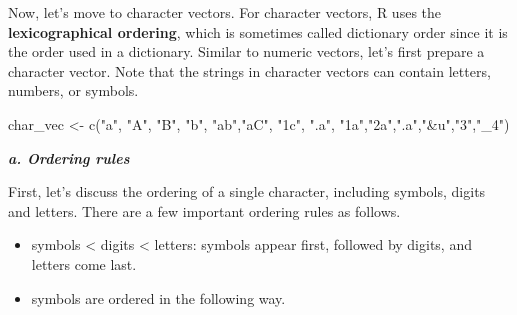 \documentclass[
]{book}
\newenvironment{Shaded}{\begin{snugshade}}{\end{snugshade}}
\newcommand{\FunctionTok}[1]{\textcolor[rgb]{0.00,0.00,0.00}{#1}}
\newcommand{\NormalTok}[1]{#1}
\newcommand{\OtherTok}[1]{\textcolor[rgb]{0.56,0.35,0.01}{#1}}
\newcommand{\StringTok}[1]{\textcolor[rgb]{0.31,0.60,0.02}{#1}}
\providecommand{\tightlist}{%
  \setlength{\itemsep}{0pt}\setlength{\parskip}{0pt}}
\begin{document}
Now, let's move to character vectors. For character vectors, R uses the \textbf{lexicographical ordering}, which is sometimes called dictionary order since it is the order used in a dictionary. Similar to numeric vectors, let's first prepare a character vector. Note that the strings in character vectors can contain letters, numbers, or symbols.

\begin{Shaded}
\begin{Highlighting}[]
\NormalTok{char\_vec }\OtherTok{\textless{}{-}} \FunctionTok{c}\NormalTok{(}\StringTok{"a"}\NormalTok{, }\StringTok{"A"}\NormalTok{, }\StringTok{"B"}\NormalTok{, }\StringTok{"b"}\NormalTok{, }\StringTok{"ab"}\NormalTok{,}\StringTok{"aC"}\NormalTok{, }\StringTok{"1c"}\NormalTok{, }\StringTok{".a"}\NormalTok{, }\StringTok{"1a"}\NormalTok{,}\StringTok{"2a"}\NormalTok{,}\StringTok{".a"}\NormalTok{,}\StringTok{"\&u"}\NormalTok{,}\StringTok{"3"}\NormalTok{,}\StringTok{"\_4"}\NormalTok{)}
\end{Highlighting}
\end{Shaded}

\textbf{\emph{a. Ordering rules}}

First, let's discuss the ordering of a single character, including symbols, digits and letters.
There are a few important ordering rules as follows.

\begin{itemize}
\tightlist
\item
  symbols \textless{} digits \textless{} letters: symbols appear first, followed by digits, and letters come last.
\item
  symbols are ordered in the following way.
\end{itemize}

\begin{Shaded}
\end{Shaded}
\end{document}
